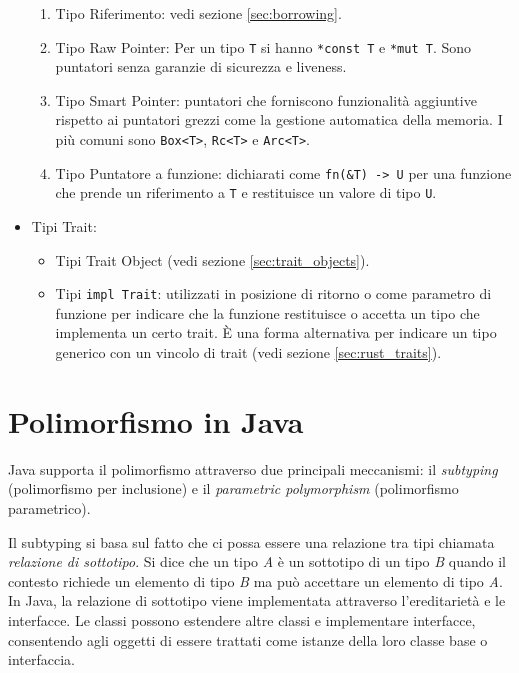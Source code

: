 \begin{itemize}
            \begin{enumerate}
                \item Tipo Riferimento: vedi sezione \ref{sec:borrowing}. 
                \item Tipo Raw Pointer: Per un tipo \texttt{T} si hanno \texttt{*const T} e \texttt{*mut T}. Sono puntatori senza garanzie di sicurezza e liveness.
                \item Tipo Smart Pointer: puntatori che forniscono funzionalità aggiuntive rispetto ai puntatori grezzi come la gestione automatica della memoria. I più comuni sono \texttt{Box<T>}, \texttt{Rc<T>} e \texttt{Arc<T>}. 
                \item Tipo Puntatore a funzione: dichiarati come \texttt{fn(\&T) -> U} per una funzione che prende un riferimento a \texttt{T} e restituisce un valore di tipo \texttt{U}.
            \end{enumerate}
        \item Tipi Trait: 
        \begin{itemize}
            \item Tipi Trait Object (vedi sezione \ref{sec:trait_objects}).
            \item Tipi \texttt{impl Trait}: utilizzati in posizione di ritorno o come parametro di funzione per indicare che la funzione restituisce o accetta un tipo che implementa un certo trait. È una forma alternativa per indicare un tipo generico con un vincolo di trait (vedi sezione \ref{sec:rust_traits}).
        \end{itemize}
\end{itemize}
\section{Polimorfismo in Java}
Java supporta il polimorfismo attraverso due principali meccanismi: il \textit{subtyping} (polimorfismo per inclusione) e il \textit{parametric polymorphism} (polimorfismo parametrico). 

Il subtyping si basa sul fatto che ci possa essere una relazione tra tipi chiamata \textit{relazione di sottotipo}. Si dice che un tipo \textit{A} è un sottotipo di un tipo \textit{B} quando il contesto richiede un elemento di tipo \textit{B} ma può accettare un elemento di tipo \textit{A}. In Java, la relazione di sottotipo viene implementata attraverso l'ereditarietà e le interfacce. Le classi possono estendere altre classi e implementare interfacce, consentendo agli oggetti di essere trattati come istanze della loro classe base o interfaccia. 

